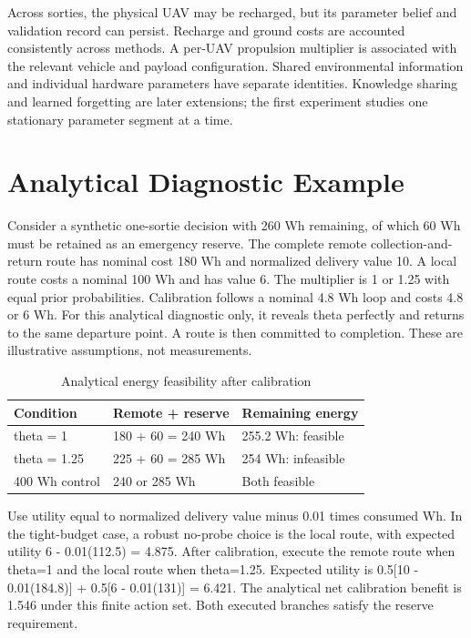 \documentclass[10pt,twocolumn,letterpaper]{article}
\begin{document}
Across sorties, the physical UAV may be recharged, but its parameter belief and validation record can persist. Recharge and ground costs are accounted consistently across methods. A per-UAV propulsion multiplier is associated with the relevant vehicle and payload configuration. Shared environmental information and individual hardware parameters have separate identities. Knowledge sharing and learned forgetting are later extensions; the first experiment studies one stationary parameter segment at a time.

\section{Analytical Diagnostic Example}
Consider a synthetic one-sortie decision with 260 Wh remaining, of which 60 Wh must be retained as an emergency reserve. The complete remote collection-and-return route has nominal cost 180 Wh and normalized delivery value 10. A local route costs a nominal 100 Wh and has value 6. The multiplier is 1 or 1.25 with equal prior probabilities. Calibration follows a nominal 4.8 Wh loop and costs 4.8 or 6 Wh. For this analytical diagnostic only, it reveals theta perfectly and returns to the same departure point. A route is then committed to completion. These are illustrative assumptions, not measurements.

\begin{table}[t]
\centering\footnotesize
\caption{Analytical energy feasibility after calibration}
\begin{tabularx}{\columnwidth}{XXX}
\toprule
Condition & Remote + reserve & Remaining energy \\
\midrule
theta = 1 & 180 + 60 = 240 Wh & 255.2 Wh: feasible \\
theta = 1.25 & 225 + 60 = 285 Wh & 254 Wh: infeasible \\
400 Wh control & 240 or 285 Wh & Both feasible \\
\bottomrule
\end{tabularx}
\end{table}
Use utility equal to normalized delivery value minus 0.01 times consumed Wh. In the tight-budget case, a robust no-probe choice is the local route, with expected utility 6 - 0.01(112.5) = 4.875. After calibration, execute the remote route when theta=1 and the local route when theta=1.25. Expected utility is 0.5[10 - 0.01(184.8)] + 0.5[6 - 0.01(131)] = 6.421. The analytical net calibration benefit is 1.546 under this finite action set. Both executed branches satisfy the reserve requirement.
\end{document}
